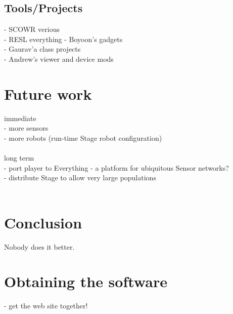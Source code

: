 \documentclass[]{article}
\begin{document}
\subsection{Tools/Projects}
\label{examples:tools}
- SCOWR verious\\
- RESL everything - Boyoon's gadgets\\
- Gaurav'a class projects\\
- Andrew's viewer and device mods\\

\section{Future work}

immediate\\
- more sensors\\
- more robots (run-time Stage robot configuration)\\
\\
long term\\
- port player to Everything - a platform for ubiquitous Sensor networks?\\
- distribute Stage to allow very large populations\\
\\
\section{Conclusion}

Nobody does it better.

\section*{Obtaining the software}

- get the web site together!



\end{document}
